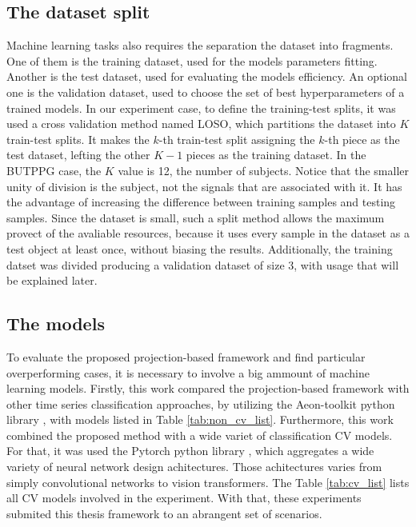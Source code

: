 \subsection{The dataset split}

Machine learning tasks also requires the separation the dataset into fragments. One of them is the training dataset, used for the models parameters fitting. Another is the test dataset, used for evaluating the models efficiency. An optional one is the validation dataset, used to choose the set of best hyperparameters of a trained models. In our experiment case, to define the training-test splits, it was used a cross validation method named \gls{LOSO}, which partitions the dataset into $K$ train-test splits. It makes the $k$-th train-test split assigning the $k$-th piece as the test dataset, lefting the other $K-1$ pieces as the training dataset. In the \gls{BUTPPG} case, the $K$ value is 12, the number of subjects. Notice that the smaller unity of division is the subject, not the signals that are associated with it. It has the advantage of increasing the difference between training samples and testing samples. Since the dataset is small, such a split method allows the maximum provect of the avaliable resources, because it uses every sample in the dataset as a test object at least once, without biasing the results. Additionally, the training datset was divided producing a validation dataset of size 3, with usage that will be explained later.

\subsection{The models}

To evaluate the proposed projection-based framework and find particular overperforming cases, it is necessary to involve a big ammount of machine learning models. Firstly, this work compared the projection-based framework with other time series classification approaches, by utilizing the Aeon-toolkit python library \cite{AeonDoc}, with models listed in Table \ref{tab:non_cv_list}. Furthermore, this work combined the proposed method with a wide variet of classification \gls{CV} models. For that, it was used the Pytorch python library \cite{PytorchDoc}, which aggregates a wide variety of neural network design achitectures. Those achitectures varies from simply convolutional networks to vision transformers. The Table \ref{tab:cv_list} lists all \gls{CV} models involved in the experiment. With that, these experiments submited this thesis framework to an abrangent set of scenarios.


